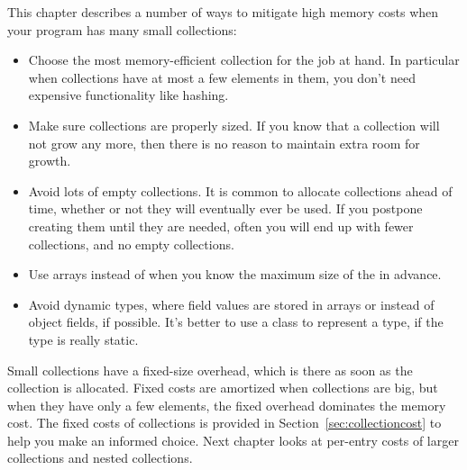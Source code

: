 This chapter describes a number of ways to mitigate high memory costs when your
program has many small collections:
\begin{itemize}
  \item Choose the most memory-efficient collection for the job at hand. In
  particular when collections have at most a few elements in them, you don't
  need expensive functionality like hashing. 
  \item Make sure collections are properly sized. If you know that a collection
  will not grow any more, then there is no reason to maintain extra room for
  growth.
  \item Avoid lots of empty collections. It is common to allocate collections 
 ahead of time, whether or not they will eventually ever be used. If you
 postpone creating them until they are needed, often you will end up with fewer collections, 
 and no empty collections.
 \item Use arrays instead of  when you know the maximum size
 of the  in advance.
 \item Avoid dynamic types, where field values are stored in arrays or
  instead of object fields, if possible. It's better to use a
 class to represent a type, if the type is really static.
\end{itemize}

Small collections have a fixed-size overhead, which is there as soon as the
collection is allocated. Fixed costs are amortized when collections are big,
but when they have only a few elements, the fixed overhead dominates the memory
cost. The fixed costs of collections is provided in
Section~\ref{sec:collectioncost} to help you make an informed choice. 
Next chapter looks at per-entry costs of larger collections and nested
collections.
 



